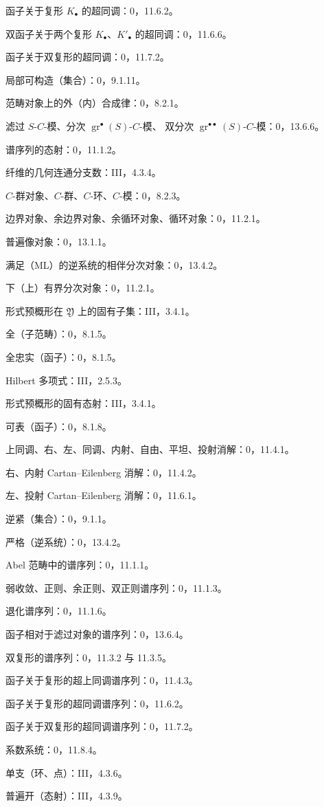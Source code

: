 \documentclass[UTF8,fontset=none,11pt,oneside,openany]{ctexbook}
\newcommand{\oldpage}[2][]{%
  \hypertarget{ega-source-page-#1-#2}{}%
  \marginnote{\scriptsize\textbf{#1}~|~#2}\ignorespaces}
\begin{document}
\begin{flushleft}
函子关于复形 $K_\bullet$ 的超同调：0，11.6.2。

双函子关于两个复形 $K_\bullet$、$K'_\bullet$ 的超同调：0，11.6.6。

函子关于双复形的超同调：0，11.7.2。

局部可构造（集合）：0，9.1.11。

范畴对象上的外（内）合成律：0，8.2.1。

\oldpage[III]{164}

滤过 $S$-$C$-模、分次 $\operatorname{gr}^\bullet(S)$-$C$-模、
双分次 $\operatorname{gr}^{\bullet\bullet}(S)$-$C$-模：0，13.6.6。

谱序列的态射：0，11.1.2。

纤维的几何连通分支数：III，4.3.4。

$C$-群对象、$C$-群、$C$-环、$C$-模：0，8.2.3。

边界对象、余边界对象、余循环对象、循环对象：0，11.2.1。

普遍像对象：0，13.1.1。

满足（ML）的逆系统的相伴分次对象：0，13.4.2。

下（上）有界分次对象：0，11.2.1。

形式预概形在 $\mathfrak Y$ 上的固有子集：III，3.4.1。

全（子范畴）：0，8.1.5。

全忠实（函子）：0，8.1.5。

Hilbert 多项式：III，2.5.3。

形式预概形的固有态射：III，3.4.1。

可表（函子）：0，8.1.8。

上同调、右、左、同调、内射、自由、平坦、投射消解：0，11.4.1。

右、内射 Cartan--Eilenberg 消解：0，11.4.2。

左、投射 Cartan--Eilenberg 消解：0，11.6.1。

逆紧（集合）：0，9.1.1。

严格（逆系统）：0，13.4.2。

Abel 范畴中的谱序列：0，11.1.1。

弱收敛、正则、余正则、双正则谱序列：0，11.1.3。

退化谱序列：0，11.1.6。

函子相对于滤过对象的谱序列：0，13.6.4。

双复形的谱序列：0，11.3.2 与 11.3.5。

函子关于复形的超上同调谱序列：0，11.4.3。

函子关于复形的超同调谱序列：0，11.6.2。

函子关于双复形的超同调谱序列：0，11.7.2。

系数系统：0，11.8.4。

单支（环、点）：III，4.3.6。

普遍开（态射）：III，4.3.9。
\end{flushleft}
\end{document}
